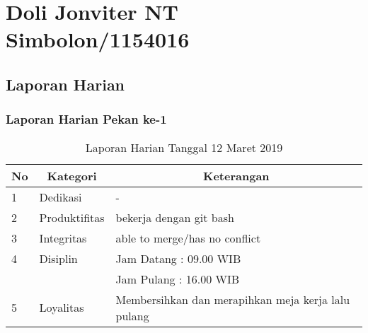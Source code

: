 \chapter{Doli Jonviter NT Simbolon/1154016}

\section{Laporan Harian}

\subsection{Laporan Harian Pekan ke-1}

\begin{table}[htp]
\caption{Laporan Harian Tanggal 12 Maret 2019}
\label{tab:lh120319}
\begin{tabular}{|l|l|l|}
\hline
\textbf{No} & \multicolumn{1}{c|}{\textbf{Kategori}} & \multicolumn{1}{c|}{\textbf{Keterangan}} \\ \hline
1 & Dedikasi & - \\ \hline
2 & Produktifitas & bekerja dengan git bash \\
3 & Integritas & able to merge/has no conflict \\ \hline
4 & Disiplin & Jam Datang : 09.00 WIB \\
 &  & Jam Pulang : 16.00 WIB \\ \hline
5 & Loyalitas & Membersihkan dan merapihkan meja kerja lalu pulang  \\ \hline
\end{tabular}
\end{table}
